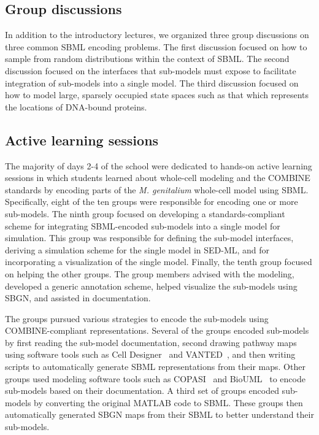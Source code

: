 \documentclass[journal,transmag]{IEEEtran}
\begin{document}
\subsection{Group discussions}
In addition to the introductory lectures, we organized three group discussions on three common SBML encoding problems. The first discussion focused on how to sample from random distributions within the context of SBML. The second discussion focused on the interfaces that sub-models must expose to facilitate integration of sub-models into a single model. The third discussion focused on how to model large, sparsely occupied state spaces such as that which represents the locations of DNA-bound proteins.

\subsection{Active learning sessions}
The majority of days 2-4 of the school were dedicated to hands-on active learning sessions in which students learned about whole-cell modeling and the COMBINE standards by encoding parts of the \textit{M. genitalium} whole-cell model using SBML. Specifically, eight of the ten groups were responsible for encoding one or more sub-models. The ninth group focused on developing a standards-compliant scheme for integrating SBML-encoded sub-models into a single model for simulation. This group was responsible for defining the sub-model interfaces, deriving a simulation scheme for the single model in SED-ML, and for incorporating a visualization of the single model. 
Finally, the tenth group focused on helping the other groups.
The group members advised with the modeling, developed a generic annotation scheme, helped visualize the sub-models using SBGN, and assisted in documentation.

The groups pursued various strategies to encode the sub-models using COMBINE-compliant representations. Several of the groups encoded sub-models by first reading the sub-model documentation, second drawing pathway maps using software tools such as Cell Designer~\cite{funahashi2008celldesigner} and VANTED~\cite{Rohn2012}, and then writing scripts to automatically generate SBML representations from their maps. Other groups used modeling software tools such as COPASI~\cite{Mendes2009} and BioUML~\cite{Kolpakov2006} to encode sub-models based on their documentation. A third set of groups encoded sub-models by converting the original MATLAB code to SBML. These groups then automatically generated SBGN maps from their SBML to better understand their sub-models.
\end{document}
